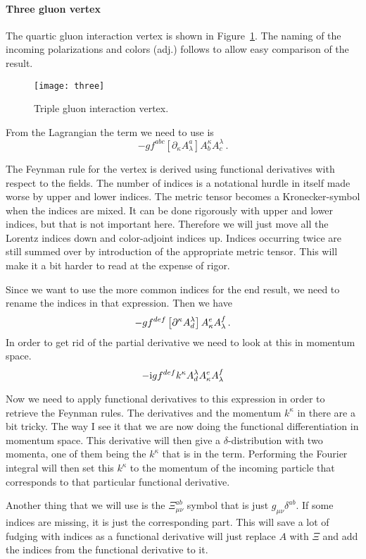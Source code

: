 \documentclass[11pt, english, fleqn, DIV=15, headinclude]{scrartcl}
\begin{document}
\paragraph{Three gluon vertex}

The quartic gluon interaction vertex is shown in Figure~\ref{fig:three}. The
naming of the incoming polarizations and colors (adj.) follows
\textcite[Figure~16.1]{Peskin/QFT/1995} to allow easy comparison of the result.

\begin{figure}
    \centering
    \texttt{[image: three]}
    \caption{%
        Triple gluon interaction vertex.
    }
    \label{fig:three}
\end{figure}

From the Lagrangian the term we need to use is
\[
    - g f^{abc} [\partial_\kappa A^a_\lambda] A^\kappa_b A^\lambda_c \,.
\]

The Feynman rule for the vertex is derived using functional derivatives with
respect to the fields. The number of indices is a notational hurdle in itself
made worse by upper and lower indices. The metric tensor becomes a
Kronecker-symbol when the indices are mixed. It can be done rigorously with
upper and lower indices, but that is not important here. Therefore we will just
move all the Lorentz indices down and color-adjoint indices up. Indices
occurring twice are still summed over by introduction of the appropriate metric
tensor. This will make it a bit harder to read at the expense of rigor.

Since we want to use the more common indices for the end result, we need to
rename the indices in that expression. Then we have
\[
    - g f^{def} \left[ \partial^\kappa A_d^\lambda \right] A_\kappa^e A_\lambda^f \,.
\]
In order to get rid of the partial derivative we need to look at this in
momentum space.
\[
    - \mathrm i g f^{def} k^\kappa A_d^\lambda A_\kappa^e A_\lambda^f
\]

Now we need to apply functional derivatives to this expression in order to
retrieve the Feynman rules. The derivatives and the momentum $k^\kappa$ in
there are a bit tricky. The way I see it that we are now doing the functional
differentiation in momentum space. This derivative will then give a
$\delta$-distribution with two momenta, one of them being the $k^\kappa$ that
is in the term. Performing the Fourier integral will then set this $k^\kappa$
to the momentum of the incoming particle that corresponds to that particular
functional derivative.

Another thing that we will use is the $\Xi_{\mu\nu}^{ab}$ symbol that is just
$g_{\mu\nu} \delta^{ab}$. If some indices are missing, it is just the
corresponding part. This will save a lot of fudging with indices as a
functional derivative will just replace $A$ with $\Xi$ and add the indices from
the functional derivative to it.
\end{document}
